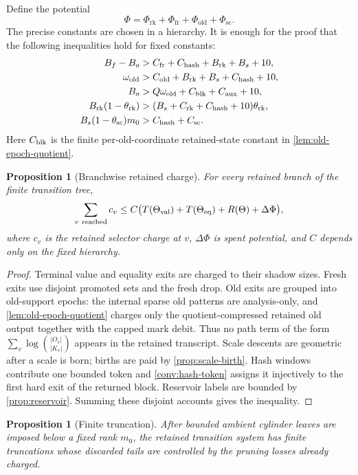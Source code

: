 \documentclass[11pt]{article}
\newcommand{\Cref}[1]{\ref{#1}}
\newtheorem{proposition}[theorem]{Proposition}
\theoremstyle{remark}
\newcommand{\old}{\mathrm{old}}
\newcommand{\fr}{\mathrm{fr}}
\newcommand{\scal}{\mathrm{sc}}
\newcommand{\rk}{\mathrm{rk}}
\begin{document}
Define the potential
\[
        \Phi=\Phi_{\rk}+\Phi_{\fr}+\Phi_{\old}+\Phi_{\scal}.
\]
The precise constants are chosen in a hierarchy.  It is enough for the proof that the following inequalities hold for fixed constants:
\begin{align*}
        B_f-B_o &> C_{\fr}+C_{\rm hash}+B_{\rk}+B_s+10,\\
        \omega_{\old} &> C_{\old}+B_{\rk}+B_s+C_{\rm hash}+10,\\
        B_o &> Q\omega_{\old}+C_{\rm blk}+C_{\rm aux}+10,\\
        B_{\rk}(1-\theta_{\rk}) &> (B_s+C_{\rk}+C_{\rm hash}+10)\theta_{\rk},\\
        B_s(1-\theta_{\scal})m_0 &> C_{\rm hash}+C_{\scal}.
\end{align*}
Here $C_{\rm blk}$ is the finite per-old-coordinate retained-state constant in \Cref{lem:old-epoch-quotient}.

\begin{proposition}[Branchwise retained charge]\label{prop:branch-charge}
For every retained branch of the finite transition tree,
\[
        \sum_{v\ {\rm reached}} c_v
        \le C\bigl(T(\Theta_{\rm val})+T(\Theta_{\rm eq})+R(\Theta)+\Delta\Phi\bigr),
\]
where $c_v$ is the retained selector charge at $v$, $\Delta\Phi$ is spent potential, and $C$ depends only on the fixed hierarchy.
\end{proposition}

\begin{proof}
Terminal value and equality exits are charged to their shadow sizes.  Fresh exits use disjoint promoted sets and the fresh drop.  Old exits are grouped into old-support epochs: the internal sparse old patterns are analysis-only, and \Cref{lem:old-epoch-quotient} charges only the quotient-compressed retained old output together with the capped mark debit.  Thus no path term of the form $\sum_v \log\binom{|O_v|}{|K_v|}$ appears in the retained transcript.  Scale descents are geometric after a scale is born; births are paid by \Cref{prop:scale-birth}.  Hash windows contribute one bounded token and \Cref{conv:hash-token} assigns it injectively to the first hard exit of the returned block.  Reservoir labels are bounded by \Cref{prop:reservoir}.  Summing these disjoint accounts gives the inequality.
\end{proof}

\begin{proposition}[Finite truncation]\label{prop:finite-truncation}
After bounded ambient cylinder leaves are imposed below a fixed rank $m_0$, the retained transition system has finite truncations whose discarded tails are controlled by the pruning losses already charged.
\end{proposition}
\end{document}
